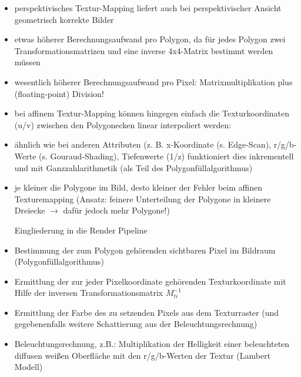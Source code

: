 \documentclass[10pt,landscape]{article}
\begin{document}
\begin{multicols}{3}
{\begin{itemize}
  $\rightarrow$ 4x4-Matrix für homogene Koordinaten. Perspektivische Abbildung im Bildraum durch Division durch z, für jedes Pixel (wesentlich aufwendiger als lineare Interpolation)
  
  Vergleich: Perspektivisches / Affines Texture Mapping:
  \item perspektivisches Textur-Mapping liefert auch bei perspektivischer Ansicht geometrisch korrekte Bilder
  \item etwas höherer Berechnungsaufwand pro Polygon, da für jedes Polygon zwei Transformationsmatrizen und eine inverse 4x4-Matrix bestimmt werden müssen
  \item wesentlich höherer Berechnungsaufwand pro Pixel: Matrixmultiplikation plus (floating-point) Division!
  \item bei affinem Textur-Mapping können hingegen einfach die Texturkoordinaten (u/v) zwischen den Polygonecken linear interpoliert werden:
  \item ähnlich wie bei anderen Attributen (z. B. x-Koordinate (s. Edge-Scan), r/g/b-Werte (s. Gouraud-Shading), Tiefenwerte (1/z) funktioniert dies inkrementell und mit Ganzzahlarithmetik (als Teil des Polygonfüllalgorithmus)
  \item je kleiner die Polygone im Bild, desto kleiner der Fehler beim affinen Texturemapping (Ansatz: feinere Unterteilung der Polygone in kleinere Dreiecke $\rightarrow$ dafür jedoch mehr Polygone!)
  
  Eingliederung in die Render Pipeline
  \item Bestimmung der zum Polygon gehörenden sichtbaren Pixel im Bildraum (Polygonfüllalgorithmus)
  \item Ermittlung der zur jeder Pixelkoordinate gehörenden Texturkoordinate mit Hilfe der inversen Transformationsmatrix $M_{ti}^{-1}$
  \item Ermittlung der Farbe des zu setzenden Pixels aus dem Texturraster (und gegebenenfalls weitere Schattierung aus der Beleuchtungsrechnung)
  \item Beleuchtungsrechnung, z.B.: Multiplikation der Helligkeit einer beleuchteten diffusen weißen Oberfläche mit den r/g/b-Werten der Textur (Lambert Modell)
  

\end{itemize}}
\end{multicols}
\end{document}
